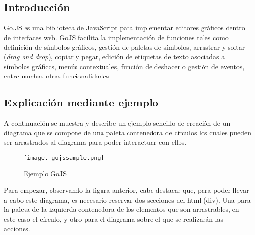 	 		

\subsection{Introducción}


Go.JS \cite{gojs} es una biblioteca de JavaScript para implementar editores gráficos dentro de interfaces web. GoJS facilita la implementación de funciones tales como definición de símbolos gráficos, gestión de paletas de símbolos, arrastrar y soltar (\emph{drag and drop}), copiar y pegar, edición de etiquetas de texto asociadas a símbolos gráficos, menús contextuales, función de deshacer o gestión de eventos, entre muchas otras funcionalidades.

\vspace{5mm}
	 		

\subsection{Explicación mediante ejemplo}

A continuación se muestra y describe un ejemplo sencillo de creación de un diagrama que se compone de una paleta contenedora de círculos los cuales pueden ser arrastrados al diagrama para poder interactuar con ellos.

\vspace{5mm}

\begin{figure}[H]
	\centering
	\texttt{[image: gojssample.png]}
	\caption{Ejemplo GoJS}\label{fig:gojssample}
\end{figure}

\vspace{5mm}

Para empezar, observando la figura anterior, cabe destacar que, para poder llevar a cabo este diagrama, es necesario reservar dos secciones del html (div). Una para la paleta de la izquierda contenedora de los elementos que son arrastrables, en este caso el círculo, y otro para el diagrama sobre el que se realizarán las acciones.


